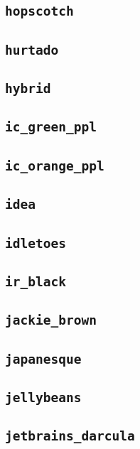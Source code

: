 \subsection{\texttt{hopscotch}}
\newpage
\subsection{\texttt{hurtado}}
\newpage
\subsection{\texttt{hybrid}}
\newpage
\subsection{\texttt{ic\_green\_ppl}}
\newpage
\subsection{\texttt{ic\_orange\_ppl}}
\newpage
\subsection{\texttt{idea}}
\newpage
\subsection{\texttt{idletoes}}
\newpage
\subsection{\texttt{ir\_black}}
\newpage
\subsection{\texttt{jackie\_brown}}
\newpage
\subsection{\texttt{japanesque}}
\newpage
\subsection{\texttt{jellybeans}}
\newpage
\subsection{\texttt{jetbrains\_darcula}}
\newpage
